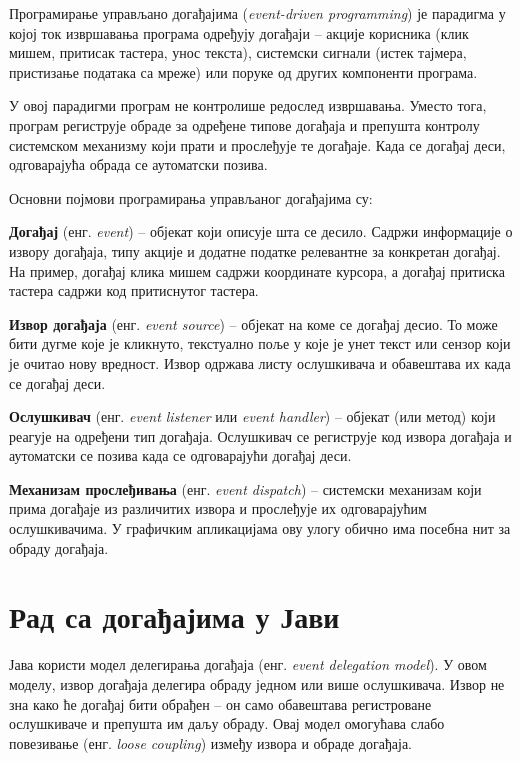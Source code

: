Програмирање управљано догађајима (\textit{event-driven programming}) је парадигма у којој ток извршавања програма одређују догађаји – акције корисника (клик мишем, притисак тастера, унос текста), системски сигнали (истек тајмера, пристизање података са мреже) или поруке од других компоненти програма.

У овој парадигми програм не контролише редослед извршавања. Уместо тога, програм региструје обраде за одређене типове догађаја и препушта контролу системском механизму који прати и прослеђује те догађаје. Када се догађај деси, одговарајућа обрада се аутоматски позива.

Основни појмови програмирања управљаног догађајима су:

\textbf{Догађај} (енг. \textit{event}) – објекат који описује шта се десило. Садржи информације о извору догађаја, типу акције и додатне податке релевантне за конкретан догађај. На пример, догађај клика мишем садржи координате курсора, а догађај притиска тастера садржи код притиснутог тастера.

\textbf{Извор догађаја} (енг. \textit{event source}) – објекат на коме се догађај десио. То може бити дугме које је кликнуто, текстуално поље у које је унет текст или сензор који је очитао нову вредност. Извор одржава листу ослушкивача и обавештава их када се догађај деси.

\textbf{Ослушкивач} (енг. \textit{event listener} или \textit{event handler}) – објекат (или метод) који реагује на одређени тип догађаја. Ослушкивач се региструје код извора догађаја и аутоматски се позива када се одговарајући догађај деси.

\textbf{Механизам прослеђивања} (енг. \textit{event dispatch}) – системски механизам који прима догађаје из различитих извора и прослеђује их одговарајућим ослушкивачима. У графичким апликацијама ову улогу обично има посебна нит за обраду догађаја.


\section{Рад са догађајима у Јави}

Јава користи модел делегирања догађаја (енг. \textit{event delegation model}). У овом моделу, извор догађаја делегира обраду једном или више ослушкивача. Извор не зна како ће догађај бити обрађен – он само обавештава регистроване ослушкиваче и препушта им даљу обраду. Овај модел омогућава слабо повезивање (енг. \textit{loose coupling}) између извора и обраде догађаја.

